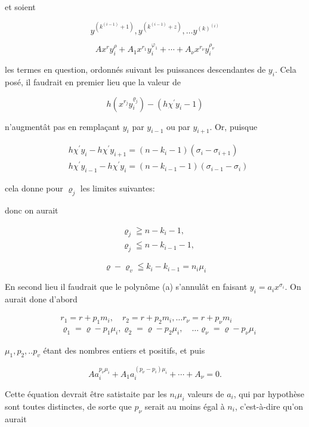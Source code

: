 \documentclass{article}
\begin{document}
et soient

\[
y^{\left(k^{(i-1)}+1\right)}, y^{\left(k^{(i-1)}+z\right)}, \ldots y^{(k)^{(i)}}
\]

\[
A x^{r} y_{i}^{\rho}+A_{1} x^{r_{1}} y_{i}^{\varphi_{1}}+\cdots+A_{\nu} x^{r_{\nu}} y_{i}^{\rho_{\nu}}
\]

les termes en question, ordonnés suivant les puissances descendantes de \(y_{i}\). Cela posé, il faudrait en premier lieu que la valeur de

\[
h\left(x^{r_{j}} y_{i}^{\varrho_{j}}\right)-\left(h \chi^{\prime} y_{i}-1\right)
\]

n'augmentât pas en remplaçant \(y_{i}\) par \(y_{i-1}\) ou par \(y_{i+1}\). Or, puisque

\[
\begin{aligned}
& h \chi^{\prime} y_{i}-h \chi^{\prime} y_{i+1}=\left(n-k_{i}-1\right)\left(\sigma_{i}-\sigma_{i+1}\right) \\
& h \chi^{\prime} y_{i-1}-h \chi^{\prime} y_{i}=\left(n-k_{i-1}-1\right)\left(\sigma_{i-1}-\sigma_{i}\right)
\end{aligned}
\]

cela donne pour \(\varrho_{j}\) les limites suivantes:

donc on aurait

\[
\begin{aligned}
& \varrho_{j} \geqq n-k_{i}-1, \\
& \varrho_{j} \leqq n-k_{i-1}-1,
\end{aligned}
\]

\[
\varrho-\varrho_{v} \leqq k_{i}-k_{i-1}=n_{i} \mu_{i}
\]

En second lieu il faudrait que le polynôme (a) s'annulât en faisant \(y_{i}=a_{i} x^{\sigma_{i}}\). On aurait done d'abord

\[
\begin{aligned}
& r_{1}=r+p_{1} m_{i}, \quad r_{2}=r+p_{2} m_{i}, \ldots r_{\nu}=r+p_{\nu} m_{i} \\
& \varrho_{1}=\varrho-p_{1} \mu_{i}, \varrho_{2}=\varrho-p_{2} \mu_{i}, \quad \ldots \varrho_{\nu}=\varrho-p_{\nu} \mu_{i}
\end{aligned}
\]

\(\mu_{1}, p_{2}, . . p_{v}\) étant des nombres entiers et positifs, et puis

\[
A a_{i}^{p_{\nu} \mu_{i}}+A_{1} a_{i}^{\left(p_{\nu}-p_{i}\right) \mu_{i}}+\cdots+A_{\nu}=0 .
\]

Cette équation devrait être satistaite par les \(n_{i} \mu_{i}\) valeurs de \(a_{i}\), qui par hypothèse sont toutes distinctes, de sorte que \(p_{\nu}\) serait au moins égal à \(n_{i}\), c'est-à-dire qu'on aurait
\end{document}
